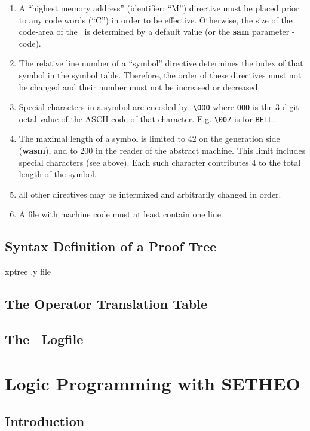 \begin{enumerate}
\item
A ``highest memory address'' (identifier: ``M'')
directive must be placed prior to any code words (``C'') in order
to be effective. Otherwise, the size of the code-area of the \SAM\ is
determined by a default value (or the {\bf sam} parameter -code).
\item
The relative line number of a ``symbol'' directive determines the index
of that symbol in the symbol table. Therefore, the order of these
directives must not be changed and their number must not be 
increased or decreased.
\item
Special characters in a symbol are encoded by: \verb+\OOO+
where {\tt OOO} is the 3-digit octal value of the ASCII code of that
character. E.g. \verb+\007+ is for {\tt BELL}.
\item
The maximal length of a symbol is limited to 42 on the 
generation side ({\bf wasm}), and to 200 in the reader of
the abstract machine.
This limit includes special characters (see above). Each such character
contributes 4 to the total length of the symbol.
\item
all other directives may be intermixed and arbitrarily changed in order.
\item
A file with machine code must at least contain one line.
\end{enumerate}

\section{Syntax Definition of a Proof Tree}
xptree .y file

\section{The Operator Translation Table}

\section{The \SAM\ Logfile}

\chapter{Logic Programming with SETHEO}
\section{Introduction}
